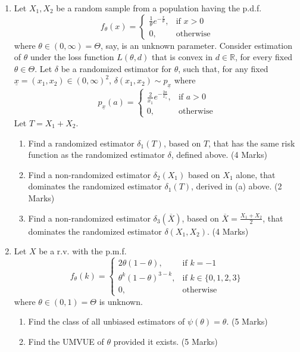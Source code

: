 \documentclass{article}
\begin{document}
\begin{enumerate}
    \item Let $X_{1}, X_{2}$ be a random sample from a population having the p.d.f.
    \[
    f_{\theta}(x) = 
    \begin{cases} 
    \frac{1}{\theta}e^{-\frac{x}{\theta}}, & \text{if } x > 0 \\
    0, & \text{otherwise}
    \end{cases}
    \]
    where $\theta \in (0, \infty) = \Theta$, say, is an unknown parameter. Consider estimation of $\theta$ under the loss function $L(\theta, d)$ that is convex in $d \in \mathbb{R}$, for every fixed $\theta \in \Theta$. Let $\delta$ be a randomized estimator for $\theta$, such that, for any fixed $\underline{x} = (x_{1}, x_{2}) \in (0, \infty)^{2}$, $\delta(x_{1}, x_{2}) \sim p_{\underline{x}}$ where
    \[
    p_{\underline{x}}(a) = 
    \begin{cases} 
    \frac{2}{x_{1}}e^{-\frac{2a}{x_{1}}}, & \text{if } a > 0 \\
    0, & \text{otherwise}
    \end{cases}
    \]
    Let $T = X_{1} + X_{2}$.
    \begin{enumerate}
        \item Find a randomized estimator $\delta_{1}(T)$, based on $T$, that has the same risk function as the randomized estimator $\delta$, defined above. \hfill (4 Marks)
        \item Find a non-randomized estimator $\delta_{2}(X_{1})$ based on $X_{1}$ alone, that dominates the randomized estimator $\delta_{1}(T)$, derived in (a) above. \hfill (2 Marks)
        \item Find a non-randomized estimator $\delta_{3}(\overline{X})$, based on $\overline{X} = \frac{X_{1}+X_{2}}{2}$, that dominates the randomized estimator $\delta(X_{1}, X_{2})$. \hfill (4 Marks)
    \end{enumerate}

    \item Let $X$ be a r.v. with the p.m.f.
    \[
    f_{\theta}(k) = 
    \begin{cases} 
    2\theta(1-\theta), & \text{if } k = -1 \\
    \theta^{k}(1-\theta)^{3-k}, & \text{if } k \in \{0, 1, 2, 3\} \\
    0, & \text{otherwise}
    \end{cases}
    \]
    where $\theta \in (0, 1) = \Theta$ is unknown.
    \begin{enumerate}
        \item Find the class of all unbiased estimators of $\psi(\theta) = \theta$. \hfill (5 Marks)
        \item Find the UMVUE of $\theta$ provided it exists. \hfill (5 Marks)
    \end{enumerate}
\end{enumerate}
\end{document}
